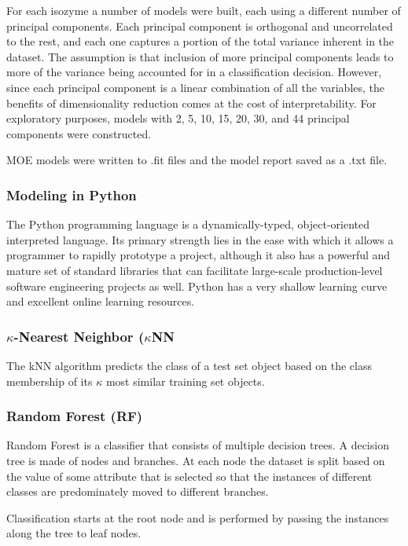 For each isozyme a number of models were built, each using a different number of principal components.  Each principal component is orthogonal and uncorrelated to the rest, and each one captures a portion of the total variance inherent in the dataset. The assumption is that inclusion of more principal components leads to more of the variance being accounted for in a classification decision. However, since each principal component is a linear combination of all the variables, the benefits of dimensionality reduction comes at the cost of interpretability.  For exploratory purposes, models with 2, 5, 10, 15, 20, 30, and 44 principal components were constructed. 

MOE models were written to .fit files and the model report saved as a .txt file.

\subsubsection{Modeling in Python}
The Python programming language is a dynamically-typed, object-oriented interpreted language. Its primary strength lies in the ease with which it allows a programmer to rapidly prototype a project, although it also has a powerful and mature set of standard libraries that can facilitate large-scale production-level software engineering projects as well. Python has a very shallow learning curve and excellent online learning resources.

\subsubsection{$\kappa$-Nearest Neighbor ($\kappa$NN}
The kNN algorithm predicts the class of a test set object based on the class membership of its $\kappa$ most similar training set objects. \cite{Lapins2013}

\subsubsection{Random Forest (RF)}
Random Forest is a classifier that consists of multiple decision trees. A decision tree is made of nodes and branches. At each node the dataset is split based on the value of some attribute that is selected so that the instances of different classes are predominately moved to different branches. 

Classification starts at the root node and is performed by passing the instances along the tree to leaf nodes. \cite{Lapins2013}

